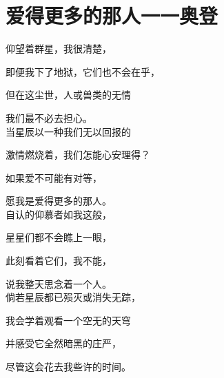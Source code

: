 
\section{爱得更多的那人一一奥登}

仰望着群星，我很清楚，

即便我下了地狱，它们也不会在乎，

但在这尘世，人或兽类的无情

我们最不必去担心。\\


当星辰以一种我们无以回报的

激情燃烧着，我们怎能心安理得？

如果爱不可能有对等，

愿我是爱得更多的那人。\\


自认的仰慕者如我这般，

星星们都不会瞧上一眼，

此刻看着它们，我不能，

说我整天思念着一个人。\\


倘若星辰都已殒灭或消失无踪，

我会学着观看一个空无的天穹

并感受它全然暗黑的庄严，

尽管这会花去我些许的时间。